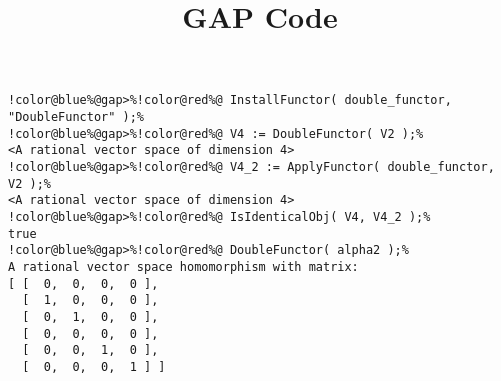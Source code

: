 \documentclass[12pt]{amsart}
\title{GAP Code}
\author{}
\begin{document}
\maketitle

\begin{Verbatim}[commandchars=!@\%,frame=single]
!color@blue%@gap>%!color@red%@ InstallFunctor( double_functor, "DoubleFunctor" );%
!color@blue%@gap>%!color@red%@ V4 := DoubleFunctor( V2 );%
<A rational vector space of dimension 4>
!color@blue%@gap>%!color@red%@ V4_2 := ApplyFunctor( double_functor, V2 );%
<A rational vector space of dimension 4>
!color@blue%@gap>%!color@red%@ IsIdenticalObj( V4, V4_2 );%
true
!color@blue%@gap>%!color@red%@ DoubleFunctor( alpha2 );%
A rational vector space homomorphism with matrix: 
[ [  0,  0,  0,  0 ],
  [  1,  0,  0,  0 ],
  [  0,  1,  0,  0 ],
  [  0,  0,  0,  0 ],
  [  0,  0,  1,  0 ],
  [  0,  0,  0,  1 ] ]
\end{Verbatim}
\end{document}
